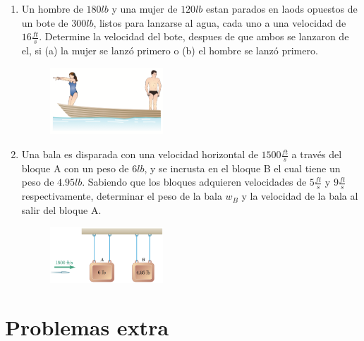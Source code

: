 \begin{enumerate}
	\item Un hombre de $180 lb$ y una mujer de $120 lb$ estan parados en laods opuestos de un bote de $300 lb$, listos para lanzarse al agua, cada uno a una velocidad de $16 \frac{ft}{s}$. Determine la velocidad del bote, despues de que ambos se lanzaron de el, si (a) la mujer se lanzó primero o (b) el hombre se lanzó primero.

	\begin{figure}[h]
		\begin{center}
			\includegraphics[width=0.4\textwidth]{./images/separados.png}
		\end{center}
	\end{figure}

	\item Una bala es disparada con una velocidad horizontal de $1500\frac{ft}{s}$ a través del bloque A con un peso de $6lb$, y se incrusta en el bloque B el cual tiene un peso de $4.95lb$. Sabiendo que los bloques adquieren velocidades de $5\frac{ft}{s}$ y $9\frac{ft}{s}$ respectivamente, determinar el peso de la bala $w_B$ y la velocidad de la bala al salir del bloque A.

	\begin{figure}[h]
		\begin{center}
			\includegraphics[width=0.4\textwidth]{./images/bala.pdf}
		\end{center}
	\end{figure}

\end{enumerate}


\section{Problemas extra}

